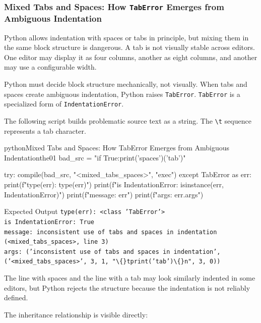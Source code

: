 \documentclass[a4paper,twoside]{report}
\begin{document}
\subsubsection{Mixed Tabs and Spaces: How \texttt{TabError} Emerges from Ambiguous Indentation}

Python allows indentation with spaces or tabs in principle, but mixing them in the same block structure is dangerous. A tab is not visually stable across editors. One editor may display it as four columns, another as eight columns, and another may use a configurable width.

Python must decide block structure mechanically, not visually. When tabs and spaces create ambiguous indentation, Python raises \texttt{TabError}. \texttt{TabError} is a specialized form of \texttt{IndentationError}.

The following script builds problematic source text as a string. The \texttt{\textbackslash t} sequence represents a tab character.

\begin{codebox}[]{python}{Mixed Tabs and Spaces: How TabError Emerges from Ambiguous Indentation}{the01}
bad_src = "if True:\n        print('spaces')\n\tprint('tab')\n"

try:
    compile(bad_src, "<mixed_tabs_spaces>", "exec")
except TabError as err:
    print(f"type(err): {type(err)}")
    print(f"is IndentationError: {isinstance(err, IndentationError)}")
    print(f"message: {err}")
    print(f"args: {err.args}")
\end{codebox}


\begin{iobox}{Expected Output}
\texttt{type(err): <class 'TabError'>} \\
\texttt{is IndentationError: True} \\
\texttt{message: inconsistent use of tabs and spaces in indentation (<mixed\_tabs\_spaces>, line 3)} \\
\texttt{args: ('inconsistent use of tabs and spaces in indentation', ('<mixed\_tabs\_spaces>', 3, 1, "\textbackslash\{\}tprint('tab')\textbackslash\{\}n", 3, 0))} \\
\end{iobox}


The line with spaces and the line with a tab may look similarly indented in some editors, but Python rejects the structure because the indentation is not reliably defined.

The inheritance relationship is visible directly:
\end{document}
